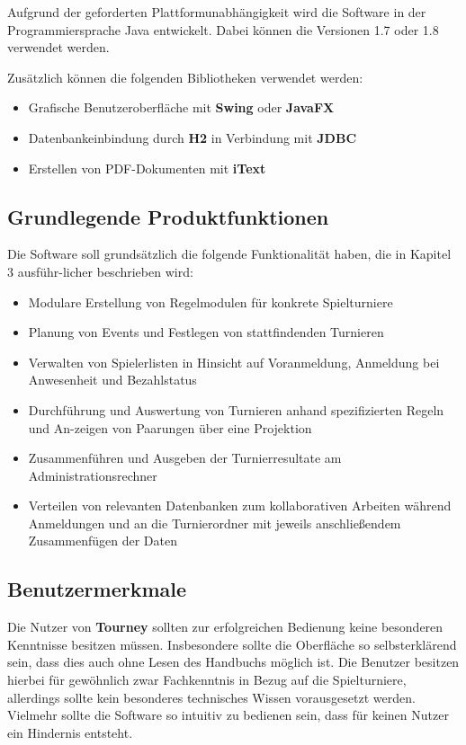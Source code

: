 \documentclass[11pt]{article}
\begin{document}
Aufgrund der geforderten Plattformunabhängigkeit wird die Software in der Programmiersprache Java entwickelt. Dabei können die Versionen 1.7 oder 1.8 verwendet werden.

Zusätzlich können die folgenden Bibliotheken verwendet werden:
\begin{itemize}
	\item Grafische Benutzeroberfläche mit \textbf{Swing} oder \textbf{JavaFX}
	\item Datenbankeinbindung durch \textbf{H2} in Verbindung mit \textbf{JDBC}
	\item Erstellen von PDF-Dokumenten mit \textbf{iText}
\end{itemize}

\subsection{Grundlegende Produktfunktionen}

Die Software soll grundsätzlich die folgende Funktionalität haben, die in Kapitel 3 ausführ-licher beschrieben wird:
\begin{itemize}
	\item Modulare Erstellung von Regelmodulen für konkrete Spielturniere
	\item Planung von Events und Festlegen von stattfindenden Turnieren
	\item Verwalten von Spielerlisten in Hinsicht auf Voranmeldung, Anmeldung bei Anwesenheit und Bezahlstatus
	\item Durchführung und Auswertung von Turnieren anhand spezifizierten Regeln und An-zeigen von Paarungen über eine Projektion
	\item Zusammenführen und Ausgeben der Turnierresultate am Administrationsrechner
	\item Verteilen von relevanten Datenbanken zum kollaborativen Arbeiten während Anmeldungen und an die Turnierordner mit jeweils anschließendem Zusammenfügen der Daten
\end{itemize}

\subsection{Benutzermerkmale}

Die Nutzer von \textbf{Tourney} sollten zur erfolgreichen Bedienung keine besonderen Kenntnisse besitzen müssen. Insbesondere sollte die Oberfläche so selbsterklärend sein, dass dies auch ohne Lesen des Handbuchs möglich ist. Die Benutzer besitzen hierbei für gewöhnlich zwar Fachkenntnis in Bezug auf die Spielturniere, allerdings sollte kein besonderes technisches Wissen vorausgesetzt werden. Vielmehr sollte die Software so intuitiv zu bedienen sein, dass für keinen Nutzer ein Hindernis entsteht.
\end{document}
